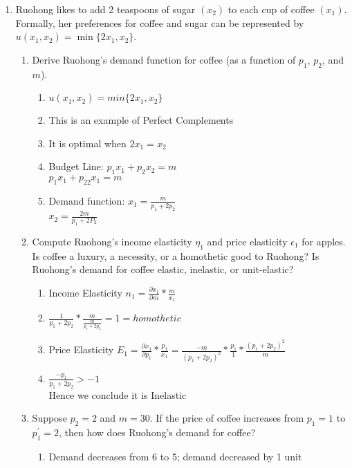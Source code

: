 \documentclass[11pt]{article}
\begin{document}
\begin{enumerate}
\item Ruohong likes to add 2 teaspoons of sugar $(x_{2})$ to each cup of coffee $(x_{1})$. Formally, her preferences for coffee and sugar can be represented by $u(x_{1},x_{2})=\min\{2x_{1},x_{2}\}$.

    \begin{enumerate}
        \item Derive Ruohong's demand function for coffee (as a function of $p_{1}$, $p_{2}$, and $m$).
        \begin{enumerate}
            \item $u(x_1, x_2) = min{\{2x_1, x_2\}}$
            \item This is an example of Perfect Complements
            \item It is optimal when $2x_1 = x_2$
            \item Budget Line: $p_1x_1 + p_2x_2 = m$\\
            $p_1x_1 + p_22x_1 = m$
            \item Demand function: $x_1 = \frac{m}{p_1+2p_2}$\\
            $x_2 = \frac{2m}{p_1+2P_2}$
        \end{enumerate}

        \item Compute Ruohong's income elasticity $\eta_{1}$ and price elasticity $\epsilon_{1}$ for apples. Is coffee a luxury, a necessity, or a homothetic good to Ruohong? Is Ruohong's demand for coffee elastic, inelastic, or unit-elastic?
        \begin{enumerate}
            \item Income Elasticity $n_1 = \frac{\partial x_1}{\partial m}*\frac{m}{x_1}$
            \item $\frac{1}{p_1 + 2p_2}*\frac{m}{\frac{m}{p_1+2p_2}} = 1 = homothetic$
            \item Price Elasticity $E_1 = \frac{\partial x_1}{\partial p_1}*\frac{p_1}{x_1}=\frac{-m}{(p_1+2p_2)^2}*\frac{p_1}{1}*\frac{(p_1+2p_2)^2}{m}$
            \item $\frac{-p_1}{p_1+2p_2} > -1$\\
            Hence we conclude it is Inelastic
        \end{enumerate}

        \item Suppose $p_{2}=2$ and $m=30$. If the price of coffee increases from $p_{1}=1$ to $p_{1}^{\prime}=2$, then how does Ruohong's demand for coffee?
        \begin{enumerate}
            \item Demand decreases from 6 to 5; demand decreased by 1 unit
        \end{enumerate}


\end{enumerate}
\end{enumerate}
\end{document}
